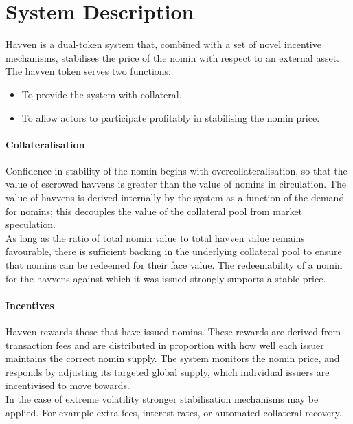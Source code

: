 \section{System Description} Havven is a dual-token system that, combined with a set of novel incentive mechanisms, stabilises the price of the nomin with respect to an external asset. \\

\noindent The havven token serves two functions:

\begin{itemize}
\item{To provide the system with collateral.}
\item{To allow actors to participate profitably in stabilising the nomin price.}
\end{itemize}

\paragraph{Collateralisation}

\noindent Confidence in stability of the nomin begins with overcollateralisation, so that the value of escrowed havvens is greater than the value of nomins in circulation. The value of havvens is derived internally by the system as a function of the demand for nomins; this decouples the value of the collateral pool from market speculation. \\

\noindent As long as the ratio of total nomin value to total havven value remains favourable, there is sufficient backing in the underlying collateral pool to ensure that nomins can be redeemed for their face value. The redeemability of a nomin for the havvens against which it was issued strongly supports a stable price.  

\paragraph{Incentives}

\noindent Havven rewards those that have issued nomins. These rewards are derived from transaction fees and are distributed in proportion with how well each issuer maintains the correct nomin supply. The system monitors the nomin price, and responds by adjusting its targeted global supply, which individual issuers are incentivised to move towards. \\

\noindent In the case of extreme volatility stronger stabilisation mechanisms may be applied. For example extra fees, interest rates, or automated collateral recovery.

